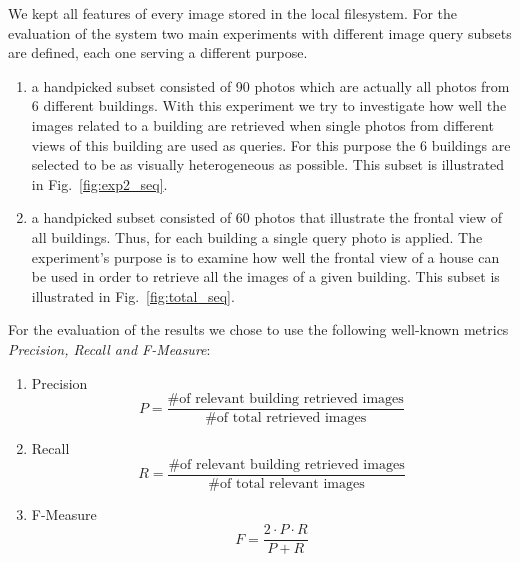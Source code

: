 We kept all features of every image stored in the local filesystem.
For the evaluation of the system two main experiments with different image query subsets are defined, each one serving a different purpose.
\begin{enumerate}
    \item a handpicked subset consisted of 90 photos which are actually all photos from 6 different buildings. With this experiment we try to investigate how well the images related to a building are retrieved when single photos from different views of this building are used as queries. 
    For this purpose the 6 buildings are selected to be as visually heterogeneous as possible.
    This subset is illustrated in Fig.~\ref{fig:exp2_seq}. 
    \item a handpicked subset consisted of 60 photos that illustrate the frontal view of all buildings. 
    Thus, for each building a single query photo is applied. The experiment's purpose is to examine how well the frontal view of a house can be used in order to retrieve all the images of a given building. This subset is illustrated in Fig.~\ref{fig:total_seq}.
\end{enumerate}
For the evaluation of the results we chose to use the following well-known metrics \textit{Precision, Recall and F-Measure}: %
\begin{enumerate}
    \item Precision
        \begin{equation}\label{eq:precision}
              \textit{P} = \frac{\text{\# of relevant building retrieved images}}{\text{\# of total retrieved images}}
        \end{equation}
        
    \item Recall
        \begin{equation}\label{eq:recall}
              \textit{R} = \frac{\text{\# of relevant building retrieved images}}{\text{\# of total relevant images}}
        \end{equation}
    \item F-Measure
        \begin{equation}\label{eq:fmeasure}
              \textit{F} = \frac{2\cdot P\cdot R}{P+R}
        \end{equation}
\end{enumerate}

